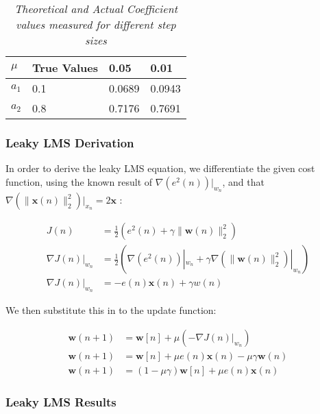 \documentclass[./main.tex]{subfiles}
\begin{document}
\begin{table}[h]
\centering
\begin{tabular}{|l|l|l|l|}
\hline
$\mu$ & True Values & 0.05   & 0.01   \\ \hline
$a_1$ & 0.1               & 0.0689 & 0.0943 \\ \hline
$a_2$ & 0.8               & 0.7176 & 0.7691 \\ \hline
\end{tabular}
\caption{\textit{Theoretical and Actual Coefficient values measured for different step sizes}}
\label{tab:3_1_d}
\end{table}

\subsubsection{Leaky LMS Derivation}
In order to derive the leaky LMS equation, we differentiate the given cost function, using the known result of $ \nabla ( e^2(n) ) |_{w_n}$, and that $ \nabla (\lVert \mathbf{x}(n)\rVert_2^2 )|_{x_n} = 2\mathbf{x} $  :

\begin{subequations}
\begin{align}
J(n) &= \frac{1}{2} ( e^2(n) + \gamma \lVert \mathbf{w}(n) \rVert_2^2 ) \\
\nabla J(n)|_{w_n} &= \frac{1}{2}  ( \nabla ( e^2(n) ) |_{w_n} + \gamma \nabla (\lVert \mathbf{w}(n)\rVert_2^2 )|_{w_n} ) \\
\nabla J(n)|_{w_n} &= -e(n) \mathbf{x}(n) + \gamma w(n)
\end{align}
\end{subequations}

We then substitute this in to the update function:

\begin{subequations}
\begin{align}
\mathbf{w}(n+1) &= \mathbf{w}[n] + \mu (- \nabla J(n)|_{w_n}) \\
\mathbf{w}(n+1) &= \mathbf{w}[n] + \mu e(n) \mathbf{x}(n) - \mu \gamma \mathbf{w}(n) \\
\mathbf{w}(n+1) &= (1 - \mu \gamma ) \mathbf{w}[n] + \mu e(n) \mathbf{x}(n)
\end{align}
\end{subequations}



\subsubsection{Leaky LMS Results}
\end{document}
